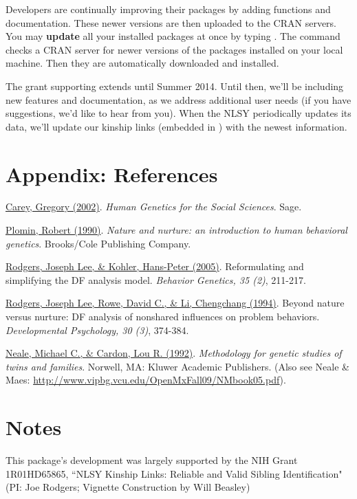 \documentclass[letterpaper]{article}\usepackage{graphicx, color}
\begin{document}
Developers are continually improving their packages by adding functions and
documentation.  These newer versions are then uploaded to the CRAN servers.  You
may \textbf{update} all your installed packages at once by typing
.  The command checks a CRAN server for
newer versions of the packages installed on your local machine.  Then they are
automatically downloaded and installed. 

The grant supporting  extends until Summer 2014.  Until then,
we'll be including new features and documentation, as we address additional user
needs (if you have suggestions, we'd like to hear from you).  When the NLSY periodically updates its data, we'll
update our kinship links (embedded in ) with the newest information.
\section{Appendix: References} \label{sec:References}
\href{http://psych.colorado.edu/~carey/hgss/}{Carey, Gregory (2002)}. \emph{Human Genetics for the Social Sciences}. Sage.

\href{http://books.google.com/books?id=r7AgAQAAIAAJ&source=gbs_navlinks_s}{Plomin, Robert (1990)}. \emph{Nature and nurture: an introduction to human behavioral genetics}.  Brooks/Cole Publishing Company.

\href{http://www.springerlink.com/content/n3x1v1q282583366}{Rodgers, Joseph Lee, \& Kohler, Hans-Peter (2005)}. Reformulating and simplifying the DF analysis model. \emph{Behavior Genetics, 35 (2)}, 211-217.

\href{http://psycnet.apa.org/journals/dev/30/3/374/}{Rodgers, Joseph Lee, Rowe, David C., \& Li, Chengchang (1994)}. Beyond nature versus nurture: DF analysis of nonshared influences on problem behaviors. \emph{Developmental Psychology, 30 (3)}, 374-384. 

\href{http://books.google.com/books/about/Methodology_for_genetic_studies_of_twins.html?id=vVzDmDv6WDkC}{Neale, Michael C., \& Cardon, Lou R. (1992)}. \emph{Methodology for genetic studies of twins and families}. Norwell, MA: Kluwer Academic Publishers. (Also see Neale \& Maes: \url{http://www.vipbg.vcu.edu/OpenMxFall09/NMbook05.pdf}).
 
\section{Notes}
This package's development was largely supported by the NIH Grant 1R01HD65865, ``NLSY Kinship Links: Reliable and Valid Sibling Identification" (PI: Joe Rodgers; Vignette Construction by Will Beasley)
\end{document}
